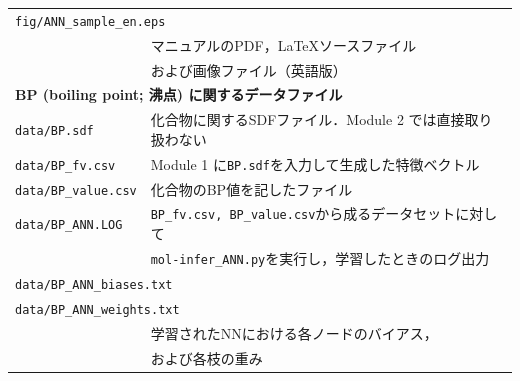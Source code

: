 \documentclass[11pt, titlepage, dvipdfmx, twoside]{jarticle}
\begin{document}
\begin{table}[h!]
\begin{tabular}{lcll}
  \multicolumn{4}{l}{\tt fig/ANN\_sample\_en.eps}\\
  &&\multicolumn{2}{l}{マニュアルのPDF，\LaTeX ソースファイル}\\
  &&\multicolumn{2}{l}{および画像ファイル（英語版）}\\
  \hline
  \multicolumn{4}{l}{\bf BP (boiling point; 沸点) に関するデータファイル~\cite{pubchem}}\\
  \multicolumn{2}{l}{\tt data/BP.sdf} & \multicolumn{2}{l}{化合物に関するSDFファイル．Module 2 では直接取り扱わない}\\
  \multicolumn{2}{l}{\tt data/BP\_fv.csv} & \multicolumn{2}{l}{Module 1 に{\tt BP.sdf}を入力して生成した特徴ベクトル}\\
  \multicolumn{2}{l}{\tt data/BP\_value.csv} & \multicolumn{2}{l}{化合物のBP値を記したファイル}\\
  \multicolumn{2}{l}{\tt data/BP\_ANN.LOG} & \multicolumn{2}{l}{{\tt BP\_fv.csv, BP\_value.csv}から成るデータセットに対して}\\
  &&\multicolumn{2}{l}{{\tt mol-infer\_ANN.py}を実行し，学習したときのログ出力}\\
  \multicolumn{4}{l}{\tt data/BP\_ANN\_biases.txt} \\
  \multicolumn{4}{l}{\tt data/BP\_ANN\_weights.txt} \\
  &&\multicolumn{2}{l}{学習されたNNにおける各ノードのバイアス，}\\
  &&\multicolumn{2}{l}{および各枝の重み}\\
  \hline
  \end{tabular}
\end{table}

\newpage
\end{document}
